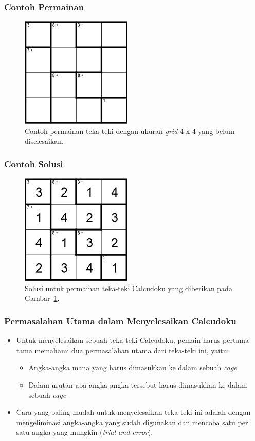 \documentclass{beamer}
\begin{document}
\begin{frame}
\frametitle{Contoh Permainan}
\begin{figure}
\centering
\captionsetup{justification=centering}
\includegraphics[scale=1]{Gambar/Backtracking1}
\caption[Contoh permainan teka-teki Calcudoku dengan ukuran \textit{grid} 4 x 4 yang belum diselesaikan. ]{Contoh permainan teka-teki dengan ukuran \textit{grid} 4 x 4 yang belum diselesaikan. }
\label{fig:backtracking1}
\end{figure}
\end{frame}

\begin{frame}
\frametitle{Contoh Solusi}
\begin{figure}
\centering
\captionsetup{justification=centering}
\includegraphics[scale=1]{Gambar/Backtracking2}
\caption[Solusi untuk permainan teka-teki Calcudoku yang diberikan pada Gambar~\ref{fig:backtracking1} ]{Solusi untuk permainan teka-teki Calcudoku yang diberikan pada Gambar~\ref{fig:backtracking1}. }
\label{fig:backtracking2}
\end{figure}
\end{frame}


\begin{frame}
\frametitle{Permasalahan Utama dalam Menyelesaikan Calcudoku}
\begin{itemize}
\item Untuk menyelesaikan sebuah teka-teki Calcudoku, pemain harus pertama-tama memahami dua permasalahan utama dari teka-teki ini, yaitu:
	\begin{itemize}
	\item Angka-angka mana yang harus dimasukkan ke dalam sebuah \textit{cage}
	\item Dalam urutan apa angka-angka tersebut harus dimasukkan ke dalam sebuah \textit{cage}
	\end{itemize}
\item Cara yang paling mudah untuk menyelesaikan teka-teki ini adalah dengan mengeliminasi angka-angka yang sudah digunakan dan mencoba satu per satu angka yang mungkin (\textit{trial and error}). 
\end{itemize}
\end{frame}
\end{document}
